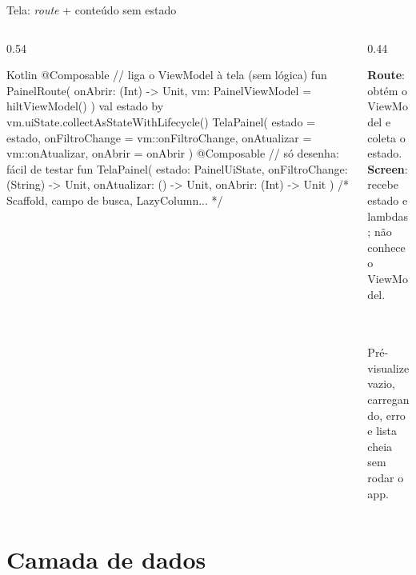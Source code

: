 \documentclass[aspectratio=169,10pt]{beamer}
\begin{document}
\begin{frame}[fragile]{Tela: \emph{route} + conteúdo sem estado}
  \begin{columns}[T]
    \begin{column}{0.54\textwidth}
\begin{codigo}[title=TelaPainel.kt]{Kotlin}
@Composable  // liga o ViewModel à tela (sem lógica)
fun PainelRoute(
  onAbrir: (Int) -> Unit,
  vm: PainelViewModel = hiltViewModel()
) {
  val estado by vm.uiState.collectAsStateWithLifecycle()
  TelaPainel(
    estado = estado,
    onFiltroChange = vm::onFiltroChange,
    onAtualizar = vm::onAtualizar,
    onAbrir = onAbrir
  )
}
@Composable  // só desenha: fácil de testar
fun TelaPainel(
  estado: PainelUiState,
  onFiltroChange: (String) -> Unit,
  onAtualizar: () -> Unit,
  onAbrir: (Int) -> Unit
) { /* Scaffold, campo de busca, LazyColumn... */ }
\end{codigo}
    \end{column}
    \begin{column}{0.44\textwidth}
      \begin{conceito}
        \textbf{Route}: obtém o ViewModel e coleta o estado.\\
        \textbf{Screen}: recebe estado e lambdas; não conhece o ViewModel.
      \end{conceito}
      \begin{dica}
        \\
        \\[2pt]
        Pré-visualize vazio, carregando, erro e lista cheia sem rodar o app.
      \end{dica}
    \end{column}
  \end{columns}
\end{frame}

\section{Camada de dados}
\end{document}
